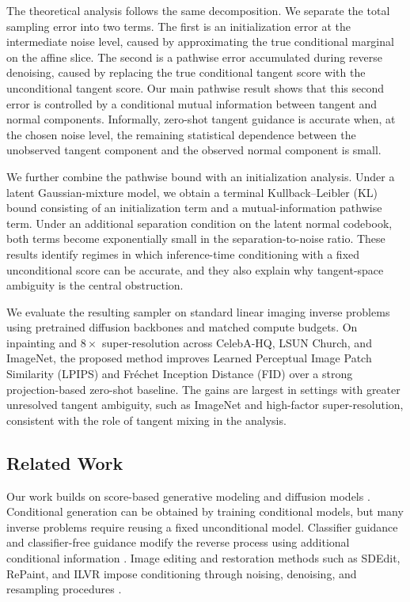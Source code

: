 \documentclass[twoside,11pt]{article}
\numberwithin{equation}{section}
\begin{document}
The theoretical analysis follows the same decomposition. We separate the total
sampling error into two terms. The first is an initialization error at the
intermediate noise level, caused by approximating the true conditional marginal
on the affine slice. The second is a pathwise error accumulated during reverse
denoising, caused by replacing the true conditional tangent score with the
unconditional tangent score. Our main pathwise result shows that this second
error is controlled by a conditional mutual information between tangent and
normal components. Informally, zero-shot tangent guidance is accurate when, at
the chosen noise level, the remaining statistical dependence between the
unobserved tangent component and the observed normal component is small.

We further combine the pathwise bound with an initialization analysis. Under a
latent Gaussian-mixture model, we obtain a terminal Kullback--Leibler (KL) bound consisting of an
initialization term and a mutual-information pathwise term. Under an additional
separation condition on the latent normal codebook, both terms become
exponentially small in the separation-to-noise ratio. These results identify
regimes in which inference-time conditioning with a fixed unconditional score
can be accurate, and they also explain why tangent-space ambiguity is the
central obstruction.

We evaluate the resulting sampler on standard linear imaging inverse problems
using pretrained diffusion backbones and matched compute budgets. On inpainting
and \(8\times\) super-resolution across CelebA-HQ, LSUN Church, and ImageNet,
the proposed method improves Learned Perceptual Image Patch Similarity (LPIPS)
and Fréchet Inception Distance (FID) over a strong projection-based zero-shot
baseline. The gains are largest in settings with greater unresolved
tangent ambiguity, such as ImageNet and high-factor super-resolution, consistent
with the role of tangent mixing in the analysis.

\subsection{Related Work}

Our work builds on score-based generative modeling and diffusion models
\citep{songermon2019score, ho2020ddpm, song2021scorebased, song2020ddim}.
Conditional generation can be obtained by training conditional models, but many
inverse problems require reusing a fixed unconditional model. Classifier
guidance and classifier-free guidance modify the reverse process using
additional conditional information \citep{dhariwal2021guided,
ho2022classifierfree}. Image editing and restoration methods such as SDEdit,
RePaint, and ILVR impose conditioning through noising, denoising, and resampling
procedures \citep{meng2022sdedit, lugmayr2022repaint, choi2021ilvr}.
\end{document}
